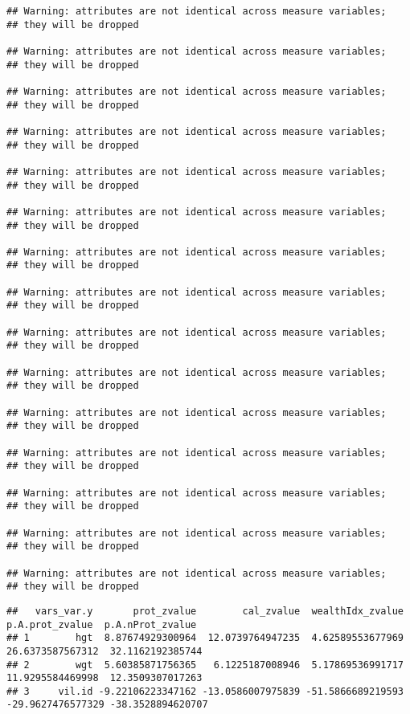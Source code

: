 \documentclass[
]{book}
\begin{document}
\begin{verbatim}
## Warning: attributes are not identical across measure variables;
## they will be dropped

## Warning: attributes are not identical across measure variables;
## they will be dropped

## Warning: attributes are not identical across measure variables;
## they will be dropped

## Warning: attributes are not identical across measure variables;
## they will be dropped

## Warning: attributes are not identical across measure variables;
## they will be dropped

## Warning: attributes are not identical across measure variables;
## they will be dropped

## Warning: attributes are not identical across measure variables;
## they will be dropped

## Warning: attributes are not identical across measure variables;
## they will be dropped

## Warning: attributes are not identical across measure variables;
## they will be dropped

## Warning: attributes are not identical across measure variables;
## they will be dropped

## Warning: attributes are not identical across measure variables;
## they will be dropped

## Warning: attributes are not identical across measure variables;
## they will be dropped

## Warning: attributes are not identical across measure variables;
## they will be dropped

## Warning: attributes are not identical across measure variables;
## they will be dropped

## Warning: attributes are not identical across measure variables;
## they will be dropped
\end{verbatim}

\begin{verbatim}
##   vars_var.y       prot_zvalue        cal_zvalue  wealthIdx_zvalue   p.A.prot_zvalue  p.A.nProt_zvalue
## 1        hgt  8.87674929300964  12.0739764947235  4.62589553677969  26.6373587567312  32.1162192385744
## 2        wgt  5.60385871756365   6.1225187008946  5.17869536991717  11.9295584469998  12.3509307017263
## 3     vil.id -9.22106223347162 -13.0586007975839 -51.5866689219593 -29.9627476577329 -38.3528894620707
\end{verbatim}
\end{document}

